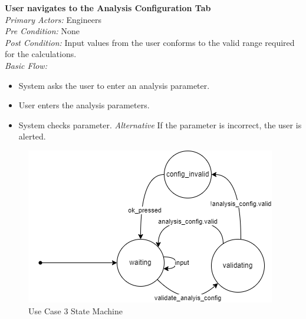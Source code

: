 \documentclass[12pt]{article}
\begin{document}
\noindent
\textbf{User navigates to the Analysis Configuration Tab} \\
\emph{  Primary Actors:} Engineers\\
\emph{  Pre Condition:} None\\
\emph{  Post Condition:} Input values from the user conforms to the valid range required for the calculations.\\ 
\emph{  Basic Flow:} 
\begin{itemize}
\item System asks the user to enter an analysis parameter. 
\item User enters the analysis parameters. 
\item System checks parameter.
\subitem \emph{Alternative} If the parameter is incorrect, the user is alerted.
\end{itemize}
\begin{figure}[H]
  \centering
  \includegraphics[width=0.5\linewidth]{use-case-3-sm.png}
  \caption{Use Case 3 State Machine}
  \label {fig:use-case-3-sm}
\end{figure}
\end{document}
